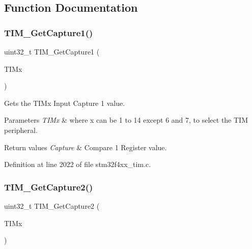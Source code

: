 \subsection{Function Documentation}
\mbox{\label{group___t_i_m___group3_ga6bd39ca543305ff0cd06fce0f678d94d}} 
\subsubsection{\texorpdfstring{T\+I\+M\+\_\+\+Get\+Capture1()}{TIM\_GetCapture1()}}
{\footnotesize\ttfamily uint32\+\_\+t T\+I\+M\+\_\+\+Get\+Capture1 (\begin{DoxyParamCaption}\item[{\hyperlink{struct_t_i_m___type_def}{T\+I\+M\+\_\+\+Type\+Def} $\ast$}]{T\+I\+Mx }\end{DoxyParamCaption})}



Gets the T\+I\+Mx Input Capture 1 value. 


\begin{DoxyParams}{Parameters}
{\em T\+I\+Mx} & where x can be 1 to 14 except 6 and 7, to select the T\+IM peripheral. \\
\hline
\end{DoxyParams}

\begin{DoxyRetVals}{Return values}
{\em Capture} & Compare 1 Register value. \\
\hline
\end{DoxyRetVals}


Definition at line 2022 of file stm32f4xx\+\_\+tim.\+c.

\mbox{\label{group___t_i_m___group3_ga2524cb5db14e388fb7f20c99fb3d58a5}} 
\subsubsection{\texorpdfstring{T\+I\+M\+\_\+\+Get\+Capture2()}{TIM\_GetCapture2()}}
{\footnotesize\ttfamily uint32\+\_\+t T\+I\+M\+\_\+\+Get\+Capture2 (\begin{DoxyParamCaption}\item[{\hyperlink{struct_t_i_m___type_def}{T\+I\+M\+\_\+\+Type\+Def} $\ast$}]{T\+I\+Mx }\end{DoxyParamCaption})}



